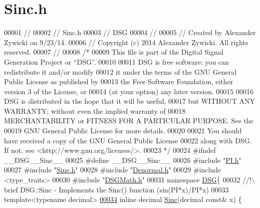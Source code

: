 \hypertarget{_sinc_8h_source}{\section{Sinc.\+h}
\label{_sinc_8h_source}
}

\begin{DoxyCode}
00001 \textcolor{comment}{//}
00002 \textcolor{comment}{//  Sinc.h}
00003 \textcolor{comment}{//  DSG}
00004 \textcolor{comment}{//}
00005 \textcolor{comment}{//  Created by Alexander Zywicki on 9/23/14.}
00006 \textcolor{comment}{//  Copyright (c) 2014 Alexander Zywicki. All rights reserved.}
00007 \textcolor{comment}{//}
00008 \textcolor{comment}{/*}
00009 \textcolor{comment}{ This file is part of the Digital Signal Generation Project or “DSG”.}
00010 \textcolor{comment}{}
00011 \textcolor{comment}{ DSG is free software: you can redistribute it and/or modify}
00012 \textcolor{comment}{ it under the terms of the GNU General Public License as published by}
00013 \textcolor{comment}{ the Free Software Foundation, either version 3 of the License, or}
00014 \textcolor{comment}{ (at your option) any later version.}
00015 \textcolor{comment}{}
00016 \textcolor{comment}{ DSG is distributed in the hope that it will be useful,}
00017 \textcolor{comment}{ but WITHOUT ANY WARRANTY; without even the implied warranty of}
00018 \textcolor{comment}{ MERCHANTABILITY or FITNESS FOR A PARTICULAR PURPOSE.  See the}
00019 \textcolor{comment}{ GNU General Public License for more details.}
00020 \textcolor{comment}{}
00021 \textcolor{comment}{ You should have received a copy of the GNU General Public License}
00022 \textcolor{comment}{ along with DSG.  If not, see <http://www.gnu.org/licenses/>.}
00023 \textcolor{comment}{ */}
00024 \textcolor{preprocessor}{#ifndef \_\_DSG\_\_Sinc\_\_}
00025 \textcolor{preprocessor}{#define \_\_DSG\_\_Sinc\_\_}
00026 \textcolor{preprocessor}{#include "\hyperlink{_p_i_8h}{PI.h}"}
00027 \textcolor{preprocessor}{#include "\hyperlink{_sine_8h}{Sine.h}"}
00028 \textcolor{preprocessor}{#include "\hyperlink{_denormal_8h}{Denormal.h}"}
00029 \textcolor{preprocessor}{#include <type\_traits>}
00030 \textcolor{preprocessor}{#include "\hyperlink{_d_s_g_math_8h}{DSGMath.h}"}
00031 \textcolor{keyword}{namespace }\hyperlink{namespace_d_s_g}{DSG}\{\textcolor{comment}{}
00032 \textcolor{comment}{    //!\(\backslash\)brief DSG::Sinc - Implements the Sinc() function (sin(PI*x)/PI*x)}
00033 \textcolor{comment}{}    \textcolor{keyword}{template}<\textcolor{keyword}{typename} decimal>
\hypertarget{_sinc_8h_source_l00034}{}\hyperlink{namespace_d_s_g_a6a99a1c242cddf18f4387f51ec8606b4}{00034}     \textcolor{keyword}{inline} decimal \hyperlink{namespace_d_s_g_a6a99a1c242cddf18f4387f51ec8606b4}{Sinc}(decimal \textcolor{keyword}{const}& x) \{

\end{DoxyCode}

